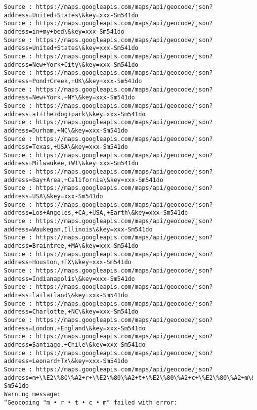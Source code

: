 \documentclass[11pt]{article}
\begin{document}
\begin{Verbatim}[commandchars=\\\{\}]
Source : https://maps.googleapis.com/maps/api/geocode/json?address=United+States\&key=xxx-Sm541do
Source : https://maps.googleapis.com/maps/api/geocode/json?address=in+my+bed\&key=xxx-Sm541do
Source : https://maps.googleapis.com/maps/api/geocode/json?address=United+States\&key=xxx-Sm541do
Source : https://maps.googleapis.com/maps/api/geocode/json?address=New+York+City\&key=xxx-Sm541do
Source : https://maps.googleapis.com/maps/api/geocode/json?address=Pond+Creek,+OK\&key=xxx-Sm541do
Source : https://maps.googleapis.com/maps/api/geocode/json?address=New+York,+NY\&key=xxx-Sm541do
Source : https://maps.googleapis.com/maps/api/geocode/json?address=at+the+dog+park\&key=xxx-Sm541do
Source : https://maps.googleapis.com/maps/api/geocode/json?address=Durham,+NC\&key=xxx-Sm541do
Source : https://maps.googleapis.com/maps/api/geocode/json?address=Texas,+USA\&key=xxx-Sm541do
Source : https://maps.googleapis.com/maps/api/geocode/json?address=Milwaukee,+WI\&key=xxx-Sm541do
Source : https://maps.googleapis.com/maps/api/geocode/json?address=Bay+Area,+California\&key=xxx-Sm541do
Source : https://maps.googleapis.com/maps/api/geocode/json?address=USA\&key=xxx-Sm541do
Source : https://maps.googleapis.com/maps/api/geocode/json?address=Los+Angeles,+CA,+USA,+Earth\&key=xxx-Sm541do
Source : https://maps.googleapis.com/maps/api/geocode/json?address=Waukegan,Illinois\&key=xxx-Sm541do
Source : https://maps.googleapis.com/maps/api/geocode/json?address=Braintree,+MA\&key=xxx-Sm541do
Source : https://maps.googleapis.com/maps/api/geocode/json?address=Houston,+TX\&key=xxx-Sm541do
Source : https://maps.googleapis.com/maps/api/geocode/json?address=Indianapolis\&key=xxx-Sm541do
Source : https://maps.googleapis.com/maps/api/geocode/json?address=la+la+land\&key=xxx-Sm541do
Source : https://maps.googleapis.com/maps/api/geocode/json?address=Charlotte,+NC\&key=xxx-Sm541do
Source : https://maps.googleapis.com/maps/api/geocode/json?address=London,+England\&key=xxx-Sm541do
Source : https://maps.googleapis.com/maps/api/geocode/json?address=Santiago,+Chile\&key=xxx-Sm541do
Source : https://maps.googleapis.com/maps/api/geocode/json?address=Leonard+Tx\&key=xxx-Sm541do
Source : https://maps.googleapis.com/maps/api/geocode/json?address=m+\%E2\%80\%A2+r+\%E2\%80\%A2+t+\%E2\%80\%A2+c+\%E2\%80\%A2+m\&key=xxx-Sm541do
Warning message:
“Geocoding "m • r • t • c • m" failed with error:


\end{Verbatim}
\end{document}
